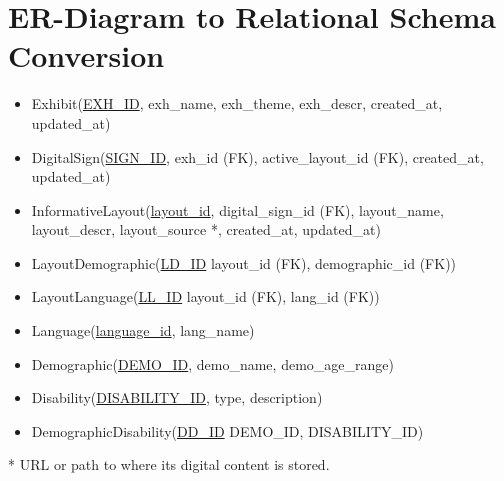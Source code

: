 \documentclass{exam}
\begin{document}
\section*{ER-Diagram to Relational Schema Conversion}
\bigskip
\begin{itemize}
\item Exhibit(\underline{EXH\_ID}, exh\_name, exh\_theme, exh\_descr, created\_at, updated\_at)

\item DigitalSign(\underline{SIGN\_ID}, exh\_id (FK), active\_layout\_id (FK), created\_at, updated\_at)

\item InformativeLayout(\underline{layout\_id}, digital\_sign\_id (FK), layout\_name, layout\_descr, layout\_source *, created\_at, updated\_at)

\item LayoutDemographic(\underline{LD\_ID} layout\_id (FK), demographic\_id (FK))

\item LayoutLanguage(\underline{LL\_ID} layout\_id (FK), lang\_id (FK))

\item Language(\underline{language\_id}, lang\_name)

\item Demographic(\underline{DEMO\_ID}, demo\_name, demo\_age\_range)

\item Disability(\underline{DISABILITY\_ID}, type, description)

\item DemographicDisability(\underline{DD\_ID} DEMO\_ID, DISABILITY\_ID)
\end{itemize}
\bigskip
* URL or path to where its digital content is stored.
\end{document}
